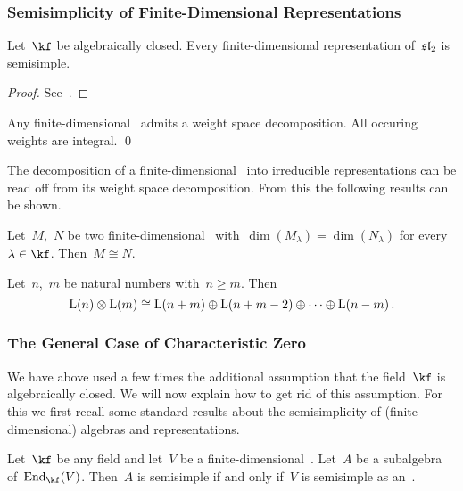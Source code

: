 \documentclass[a4paper, 11pt, oneside]{scrartcl}
\begin{document}
\subsubsection{Semisimplicity of Finite-Dimensional Representations}

\begin{theorem}[Weyl]
  \label{weyl for sl2}
  Let~$\kf$ be algebraically closed.
  Every finite-dimensional representation of~$\mathfrak{sl}_2$ is semisimple.
\end{theorem}

\begin{proof}
  See~\cite[Theorem~6.3]{humphreys_lie_algebras}.
\end{proof}

\begin{corollary}
  \label{weight space decomposition for sl2}
  Any finite-dimensional~ admits a weight space decomposition.
  All occuring weights are integral.
  \qed
\end{corollary}

The decomposition of a finite-dimensional~ into irreducible representations can be read off from its weight space decomposition.
From this the following results can be shown.

\begin{lemma}
  Let~$M$,~$N$ be two finite-dimensional~ with~$\dim(M_\lambda) = \dim(N_\lambda)$ for every~$\lambda \in \kf$.
  Then~$M \cong N$.
\end{lemma}

\begin{corollary}
  Let~$n$,~$m$ be natural numbers with~$n \geq m$.
  Then
  \[
    \operatorname{L}(n) \otimes \operatorname{L}(m)
    \cong
    \operatorname{L}(n + m) \oplus \operatorname{L}(n + m - 2) \oplus \dotsb \oplus \operatorname{L}(n - m) \,.
  \]
\end{corollary}

\subsubsection{The General Case of Characteristic Zero}

We have above used a few times the additional assumption that the field~$\kf$ is algebraically closed.
We will now explain how to get rid of this assumption.
For this we first recall some standard results about the semisimplicity of (finite-dimensional) algebras and representations.

\begin{lemma}
  \label{semisimplicity via faithful representation}
  Let~$\kf$ be any field and let~$V$ be a finite-dimensional~\vectorspaces{$\kf$}.
  Let~$A$ be a subalgebra of~$\End_{\kf}(V)$.
  Then~$A$ is semisimple if and only if~$V$ is semisimple as an~.
\end{lemma}
\end{document}
